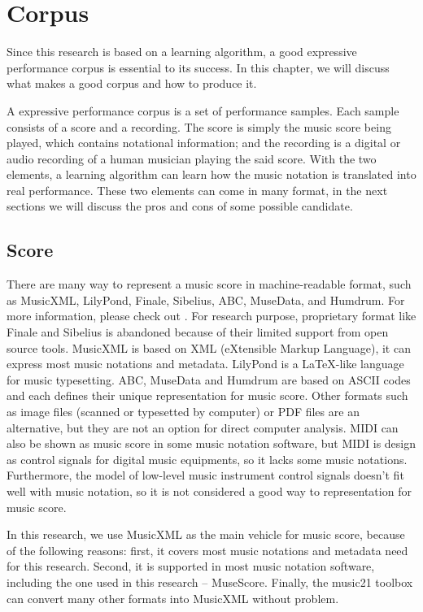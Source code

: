 \chapter{Corpus}
Since this research is based on a learning algorithm, a good expressive performance corpus is essential to its success. In this chapter, we will discuss what makes a good corpus and how to produce it. 

A expressive performance corpus is a set of performance samples. Each sample consists of a score and a recording. The score is simply the music score being played, which contains notational information; and the recording is a digital or audio recording of a human musician playing the said score. With the two elements, a learning algorithm can learn how the music notation is translated into real performance. These two elements can come in many format, in the next sections we will discuss the pros and cons of some possible candidate.

\section{Score}

There are many way to represent a music score in machine-readable format, such as MusicXML\cite{Good2001}, LilyPond\cite{LilyPond}, Finale, Sibelius, ABC, MuseData, and Humdrum. For more information, please check out \cite{Selfridge-Field1997}. For research purpose, proprietary format like Finale and Sibelius is abandoned because of their limited support from open source tools. MusicXML is based on XML (eXtensible Markup Language), it can express most music notations and metadata. LilyPond is a \LaTeX-like language for music typesetting. ABC, MuseData and Humdrum are based on ASCII codes and each defines their unique representation for music score. 
Other formats such as image files (scanned or typesetted by computer) or PDF files are an alternative, but they are not an option for direct computer analysis. MIDI can also be shown as music score in some music notation software, but MIDI is design as control signals for digital music equipments, so it lacks some music notations. Furthermore, the model of low-level music instrument control signals doesn't fit well with music notation, so it is not considered a good way to representation for music score.

In this research, we use MusicXML as the main vehicle for music score, because of the following reasons: first, it covers most music notations and metadata need for this research. Second, it is supported in most music notation software, including the one used in this research -- MuseScore. Finally, the music21 toolbox can convert many other formats into MusicXML without problem.
 
